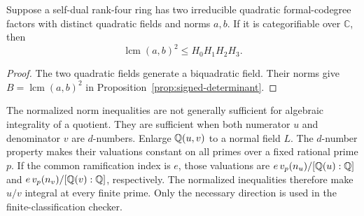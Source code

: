 \begin{corollary}\label{cor:two-quadratic-determinant}
Suppose a self-dual rank-four ring has two irreducible quadratic
formal-codegree factors with distinct quadratic fields and norms $a,b$.
If it is categorifiable over $\mathbb C$, then
\[
 \operatorname{lcm}(a,b)^2\leq H_0H_1H_2H_3.
\]
\end{corollary}
\begin{proof}
The two quadratic fields generate a biquadratic field. Their norms give
$B=\operatorname{lcm}(a,b)^2$ in Proposition~\ref{prop:signed-determinant}.
\end{proof}

\begin{remark}
The normalized norm inequalities are not generally sufficient for
algebraic integrality of a quotient. They are sufficient when both
numerator $u$ and denominator $v$ are $d$-numbers. Enlarge $\mathbb Q(u,v)$
to a normal field $L$. The $d$-number property makes their valuations
constant on all primes over a fixed rational prime $p$. If the common
ramification index is $e$, those valuations are
$e\,v_p(n_u)/[\mathbb Q(u):\mathbb Q]$ and
$e\,v_p(n_v)/[\mathbb Q(v):\mathbb Q]$, respectively. The normalized inequalities
therefore make $u/v$ integral at every finite prime. Only the necessary
direction is used in the finite-classification checker.
\end{remark}
